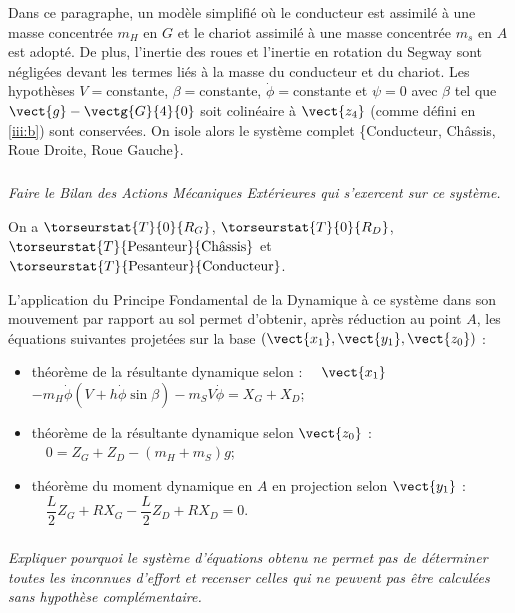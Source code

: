 \documentclass[10pt,fleqn]{article} %
\begin{document}
\ifprof
\else

Dans ce paragraphe, un modèle simplifié où le conducteur est assimilé à une masse concentrée $m_H$ en $G$  et le chariot  assimilé à une masse concentrée $m_s$ en $A$ est adopté. De plus, l’inertie des roues et l'inertie en rotation du Segway sont négligées devant les termes liés à la masse du conducteur et du chariot. Les hypothèses $V =$constante, $\beta =$constante, $\dot{\phi} =$constante et $\psi=0$ avec $\beta$ tel que $\vect{g}-\vectg{G}{4}{0}$ soit colinéaire à 
$\vect{z_4}$ (comme défini en \ref{iii:b}) sont conservées. On isole alors le système complet \{Conducteur, Châssis, Roue Droite, Roue Gauche\}. 
\fi

\subparagraph{\label{q_13}}\textit{Faire le Bilan des Actions Mécaniques Extérieures qui s’exercent sur ce système.
}
\ifprof
\begin{corrige}
On a $\torseurstat{T}{0}{R_G}$, $\torseurstat{T}{0}{R_D}$, $\torseurstat{T}{\text{Pesanteur}}{\text{Châssis}}$ et $\torseurstat{T}{\text{Pesanteur}}{\text{Conducteur}}$.

\end{corrige}
\else
\fi

\ifprof
\else

L’application du Principe Fondamental de la Dynamique à ce système dans son mouvement par rapport au sol permet d’obtenir, après réduction au point $A$, les équations suivantes projetées sur la base $\left(\vect{x_1},\vect{y_1},\vect{z_0} \right)$ :
\begin{itemize} 
\item théorème de la résultante dynamique selon : $\quad \vect{x_1}$
$-m_H\dot{\phi} \left(V + h\dot{\phi} \sin\beta\right)-m_SV\dot{\phi} =X_G + X_D$;
\item théorème de la résultante dynamique selon $\vect{z_0}$  : $\quad 0=Z_G + Z_D - \left(m_H+m_S\right)g$;
\item théorème du moment dynamique en $A$ en projection selon $\vect{y_1}$  : $\quad \dfrac{L}{2}Z_G + RX_G - \dfrac{L}{2}Z_D + RX_D= 0$.
 \end{itemize}
 \fi
 
\subparagraph{\label{q_14}}\textit{Expliquer pourquoi le système d’équations obtenu ne permet pas de déterminer toutes les inconnues d’effort et recenser celles qui ne peuvent pas être calculées sans hypothèse complémentaire.}%
\ifprof
\begin{corrige}

\end{corrige}
\else
\fi
\end{document}
